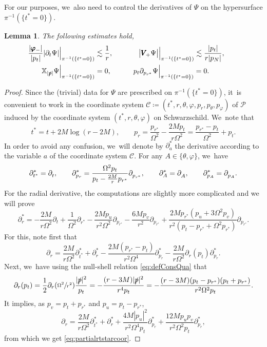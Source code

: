\documentclass[JEP,XML,SOM,Unicode,published]{cedram}
\theoremstyle{plain}
\newtheorem{lemma}[proposition]{Lemma}
\theoremstyle{definition}
\newcommand\T{{\mathbb{X}}}
\begin{document}
For our purposes, we~also need to control the derivatives of $\Psi$ on the hypersurface $\pi^{-1}(\{t^* =0 \})$.

\begin{lemma}\label{LemderivPsiini}
The following estimates hold,
\begin{alignat*}{2}
\frac{|\pmb{\varphi}_-|}{|p_t|}| \partial_t \Psi | \Big\vert_{\pi^{-1} (\{t^* = 0 \})} &\lesssim \frac{1}{r},\qquad && \; \; \, \big| \pmb{V}_{\! +} \Psi \big| \Big\vert_{\pi^{-1} (\{t^* = 0 \})} \lesssim \frac{|p_t|}{r|p_N|}, \qquad \\
\T_{|\slashed{p}|} \Psi \Big\vert_{\pi^{-1} (\{t^* = 0 \})}&= 0, && p_t\partial_{p_{r^*}}\Psi \Big\vert_{\pi^{-1} (\{t^* = 0 \})}=0.
\end{alignat*}
\end{lemma}
\begin{proof}
Since the (trivial) data for $\Psi$ are prescribed on $\pi^{-1}(\{t^*=0 \})$, it~is convenient to work in the coordinate system $\mathscr{C} \coloneqq (t^*,r,\theta, \varphi,p_r,p_\theta,p_\varphi)$ of $\mathcal{P}$ induced by the coordinate system $(t^*,r,\theta,\varphi)$ on Schwarzschild. We~note that
\[
t^* = t+2M\log (r-2M),\qquad p_r=\frac{p_{r^*}}{\Omega^2}-\frac{2M p_t}{r \Omega^2}= \frac{p_{r^*}-p_t}{\Omega^2} +p_t.
\]
In order to avoid any confusion, we~will denote by $\partial^*_a$ the derivative according to the variable $a$ of the coordinate system $\mathscr{C}$. For any $A \in \{ \theta, \varphi \}$, we~have
\[
\partial^*_{t^*} = \partial_{t}^{\mathstrut}, \qquad \partial^*_{p_r} =\frac{\Omega^2 p_t}{p_t-\frac{2M}{r}p_{r^*}} \partial_{p_{r^*}}^{\mathstrut}, \qquad \partial^*_A=\partial_A^{\mathstrut}, \qquad \partial^*_{p_A}=\partial_{p_A}^{\mathstrut}.
\]
For the radial derivative, the computations are slightly more complicated and we will prove
\begin{equation}\label{eq:partialrtstarcoor}
\partial^*_{r}=-\frac{2M}{r\Omega^2} \partial_t+ \frac{1}{\Omega^2} \partial_{r^*} -\frac{2Mp_u}{r^2\Omega^2}\partial_{p_{r^*}}-\frac{6M p_v}{r^2}\partial_{p_{r^*}}+\frac{2M p_{r^*}(p_u+3 \Omega^2 p_v)}{r^2(p_t-p_{r^*}+\Omega^2 p_{r^*})} \partial_{p_{r^*}}.
\end{equation}
For this, note first that
\[
\partial_r = \frac{2M}{r \Omega^2} \partial^*_{t^*}+\partial^*_r-\frac{2M(p_{r^*}-p_t)}{r^2\Omega^4}\partial^*_{p_r}-\frac{2M}{r\Omega^2} \partial_r (p_t)\partial^*_{p_r}.
\]
Next, we~have using the null-shell relation \eqref{eq:defConsQua} that
\[
\partial_r (p_t) = \frac{1}{2}\partial_r(\sfrac{\Omega^2}{r^2}) \frac{|\slashed{p}|^2}{p_t} = - \frac{(r-3M)|\slashed{p}|^2}{r^4 p_t} = - \frac{(r-3M)(p_t-p_{r^*})(p_t+p_{r^*})}{r^2 \Omega^2 p_t}.
\]
It implies, as $p_v=p_t+p_{r^*}$ and $p_u=p_t-p_{r^*}$,
\[
\partial_r = \frac{2M}{r \Omega^2} \partial^*_{t^*}+\partial^*_r+\frac{4M|p_u|^2}{r^2\Omega^4p_t}\partial^*_{p_r}+\frac{12M p_up_v}{r^2\Omega^2p_t} \partial^*_{p_r},
\]
from which we get \eqref{eq:partialrtstarcoor}.


\end{proof}
\end{document}
